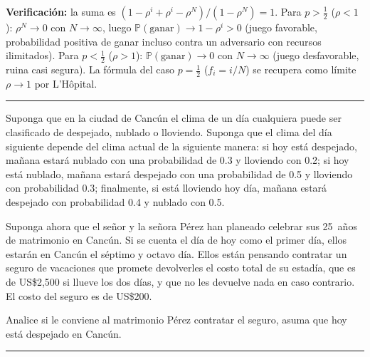\documentclass[10pt,a4paper]{article}
\newcommand{\Prob}[1]{\mathbb{P}\!\left(#1\right)}
\newenvironment{enunciado}[1]{%
  \begin{tcolorbox}[
    breakable,
    colback=sectionbg!8, colframe=sectionbg,
    boxrule=0.8pt, arc=3pt, left=8pt, right=8pt, top=6pt, bottom=6pt,
    fonttitle=\normalsize\bfseries\sffamily, coltitle=white, colbacktitle=sectionbg, titlerule=0pt,
    title={#1},
  ]%
}{\end{tcolorbox}}
\newenvironment{nota}{\begin{tcolorbox}[notebox]}{\end{tcolorbox}}
\begin{document}
\begin{nota}
  \textbf{Verificaci\'on:} la suma es $(1-\rho^i+\rho^i-\rho^N)/(1-\rho^N)=1$. Para
  $p>\tfrac{1}{2}$ ($\rho<1$): $\rho^N\to 0$ con $N\to\infty$, luego
  $\Prob{\text{ganar}}\to 1-\rho^i>0$ (juego favorable, probabilidad positiva de
  ganar incluso contra un adversario con recursos ilimitados). Para $p<\tfrac{1}{2}$
  ($\rho>1$): $\Prob{\text{ganar}}\to 0$ con $N\to\infty$ (juego desfavorable,
  ruina casi segura). La f\'ormula del caso $p=\tfrac{1}{2}$ ($f_i=i/N$) se
  recupera como l\'imite $\rho\to 1$ por L'H\^opital.
\end{nota}

\vspace{10pt}
{\color{subsecbg!60}\hrule}
\vspace{6pt}

\begin{enunciado}{P22 \textperiodcentered\ Clima en Canc\'un: seguro de vacaciones}
  Suponga que en la ciudad de Canc\'un el clima de un d\'ia cualquiera puede ser
  clasificado de despejado, nublado o lloviendo. Suponga que el clima del d\'ia
  siguiente depende del clima actual de la siguiente manera: si hoy est\'a despejado,
  ma\~nana estar\'a nublado con una probabilidad de 0.3 y lloviendo con 0.2; si hoy
  est\'a nublado, ma\~nana estar\'a despejado con una probabilidad de 0.5 y lloviendo
  con probabilidad 0.3; finalmente, si est\'a lloviendo hoy d\'ia, ma\~nana estar\'a
  despejado con probabilidad 0.4 y nublado con 0.5.

  \smallskip
  Suponga ahora que el se\~nor y la se\~nora P\'erez han planeado celebrar sus 25~a\~nos
  de matrimonio en Canc\'un. Si se cuenta el d\'ia de hoy como el primer d\'ia, ellos
  estar\'an en Canc\'un el s\'eptimo y octavo d\'ia. Ellos est\'an pensando contratar
  un seguro de vacaciones que promete devolverles el costo total de su estad\'ia, que
  es de US\$2{,}500 si llueve los dos d\'ias, y que no les devuelve nada en caso
  contrario. El costo del seguro es de US\$200.

  \smallskip
  Analice si le conviene al matrimonio P\'erez contratar el seguro, asuma que hoy
  est\'a despejado en Canc\'un.
\end{enunciado}

\vspace{10pt}
{\color{subsecbg!60}\hrule}
\vspace{6pt}
\end{document}
